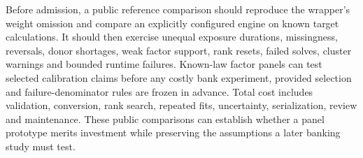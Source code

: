 Before admission, a public reference comparison should reproduce the
wrapper's weight omission and compare an explicitly configured engine on
known target calculations. It should then exercise unequal exposure
durations, missingness, reversals, donor shortages, weak factor support,
rank resets, failed solves, cluster warnings and bounded runtime failures.
Known-law factor panels can test selected calibration claims before any
costly bank experiment, provided selection and failure-denominator rules
are frozen in advance. Total cost includes validation, conversion, rank
search, repeated fits, uncertainty, serialization, review and maintenance.
These public comparisons can establish whether a panel prototype merits
investment while preserving the assumptions a later banking study must test.
\citep{exec21_gsynth_reference}
